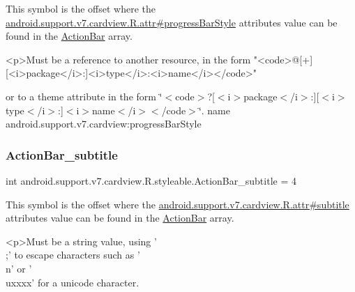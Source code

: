 This symbol is the offset where the \hyperlink{classandroid_1_1support_1_1v7_1_1cardview_1_1R_1_1attr_ad468367fc676d8428c2d4cd2e10ed43e}{android.\+support.\+v7.\+cardview.\+R.\+attr\#progress\+Bar\+Style} attribute\textquotesingle{}s value can be found in the \hyperlink{classandroid_1_1support_1_1v7_1_1cardview_1_1R_1_1styleable_a0cbf7f776e31f78bb0a2b558daf176f8}{Action\+Bar} array.

\begin{DoxyVerb}      <p>Must be a reference to another resource, in the form "<code>@[+][<i>package</i>:]<i>type</i>:<i>name</i></code>"
\end{DoxyVerb}
 or to a theme attribute in the form \char`\"{}$<$code$>$?\mbox{[}$<$i$>$package$<$/i$>$\+:\mbox{]}\mbox{[}$<$i$>$type$<$/i$>$\+:\mbox{]}$<$i$>$name$<$/i$>$$<$/code$>$\char`\"{}.  name android.\+support.\+v7.\+cardview\+:progress\+Bar\+Style \mbox{\label{classandroid_1_1support_1_1v7_1_1cardview_1_1R_1_1styleable_a047276d496fb9634eb85f40b248c71bc}} 
\subsubsection{\texorpdfstring{Action\+Bar\+\_\+subtitle}{ActionBar\_subtitle}}
{\footnotesize\ttfamily int android.\+support.\+v7.\+cardview.\+R.\+styleable.\+Action\+Bar\+\_\+subtitle = 4\hspace{0.3cm}{\ttfamily [static]}}

This symbol is the offset where the \hyperlink{classandroid_1_1support_1_1v7_1_1cardview_1_1R_1_1attr_a05ab66196223ffd287bd23667d4122cd}{android.\+support.\+v7.\+cardview.\+R.\+attr\#subtitle} attribute\textquotesingle{}s value can be found in the \hyperlink{classandroid_1_1support_1_1v7_1_1cardview_1_1R_1_1styleable_a0cbf7f776e31f78bb0a2b558daf176f8}{Action\+Bar} array.

\begin{DoxyVerb}      <p>Must be a string value, using '\\;' to escape characters such as '\\n' or '\\uxxxx' for a unicode character.
\end{DoxyVerb}
 

